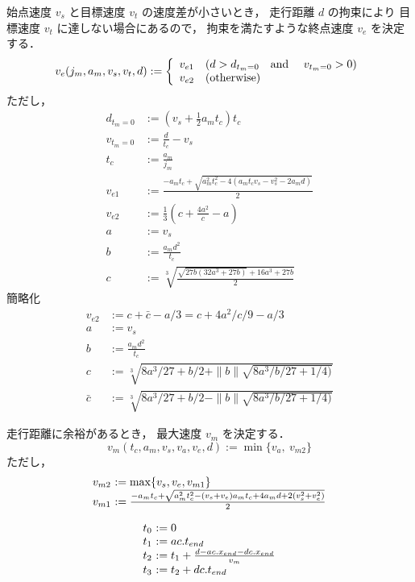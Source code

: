 \documentclass[a5paper]{ltjsarticle}
\begin{document}
始点速度 $v_s$ と目標速度 $v_t$ の速度差が小さいとき，
走行距離 $d$ の拘束により
目標速度 $v_t$ に達しない場合にあるので，
拘束を満たすような終点速度 $v_e$ を決定する．
\begin{align}
    v_e(j_m, a_m, v_s, v_t, d) :=
    \left\{\begin{array}{ll}
        v_{e1} & (d > d_{t_m=0} \mbox{\quad and \quad} v_{t_m=0} > 0)
        \\
        v_{e2} & (\mbox{otherwise})
    \end{array}\right.
\end{align}
ただし，
\begin{align}
    d_{t_m=0} & := \left( v_s + \frac{1}{2} a_m t_c \right) t_c
    \\
    v_{t_m=0} & := \frac{d}{t_c} - v_s
    \\
    t_c       & := \frac{a_m}{j_m}
    \\
    v_{e1}    & := \frac{-a_m t_c + \sqrt{a_m^2 t_c^2-4(a_m t_c v_s - v_s^2 - 2a_m d)}}{2}
    \\
    v_{e2}    & := \frac{1}{3}\left(c +\frac{4a^2}{c} -a \right)
    \\
    a         & := v_s
    \\
    b         & := \frac{a_md^2}{t_c}
    \\
    c         & := \sqrt[3]{\frac{\sqrt{27b(32a^3+27b)} + 16a^3+27b}{2}}
\end{align}
簡略化
\begin{align}
    v_{e2}  & := c +\bar{c} - a/3 = c + 4a^2/c/9 - a/3
    \\
    a       & := v_s
    \\
    b       & := \frac{a_md^2}{t_c}
    \\
    c       & := \sqrt[3]{8a^3/27+b/2 + \|b\|\sqrt{8a^3/b/27+1/4)}}
    \\
    \bar{c} & := \sqrt[3]{8a^3/27+b/2 - \|b\|\sqrt{8a^3/b/27+1/4)}}
\end{align}

走行距離に余裕があるとき，
最大速度 $v_m$ を決定する．
$$
    v_m(t_c, a_m, v_s, v_a, v_e, d) := \min\{v_a,~v_{m2}\}
$$
ただし，
$$
    \begin{array}{l@{~}l}
        v_{m2} & := \max\{v_s, v_e, v_{m1}\}                                                   \\
        v_{m1} & := \frac{-a_mt_c + \sqrt{a_m^2t_c^2-(v_s+v_e)a_mt_c+4a_md+2(v_s^2+v_e^2)}}{2}
    \end{array}
$$

$$
    \begin{array}{l@{~}l}
        t_0 & := 0
        \\
        t_1 & := ac.t_{end}
        \\
        t_2 & := t_1 +             \frac{d - ac.x_{end} - dc.x_{end}}{v_m}
        \\
        t_3 & := t_2 + dc.t_{end}
    \end{array}
$$
\end{document}
